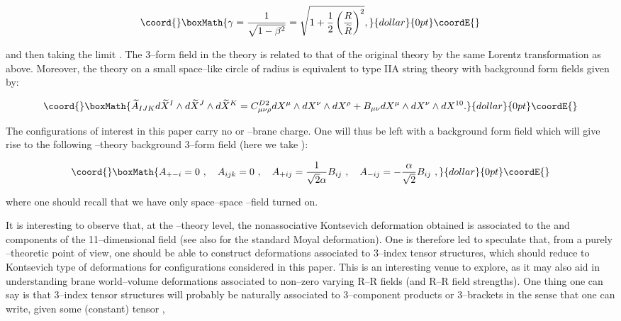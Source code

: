 \documentclass[a4paper,11pt]{article}
\begin{document}
$$\coord{}\boxMath{
\gamma = {1\over \sqrt{1-\beta^{2}}} = \sqrt{1+{1\over 2} \left( {R 
\over \widetilde{R}} \right)^{2}},
}{dollar}{0pt}\coordE{}$$

\noindent
and then taking the limit \coordHE{}. The 3--form field
\coordHE{} in the theory \coordHE{} is related to that of
the original theory \coordHE{} by the same Lorentz transformation as
above. Moreover, the theory \coordHE{} on a small space--like circle
of radius \coordHE{} is equivalent to type IIA string theory with
background form fields given by:

$$\coord{}\boxMath{
\widetilde{A}_{IJK} d\widetilde{X}^{I} \wedge d\widetilde{X}^{J} 
\wedge d\widetilde{X}^{K} = C^{D2}_{\mu\nu\rho} dX^{\mu} \wedge 
dX^{\nu} \wedge dX^{\rho} + B_{\mu\nu} dX^{\mu} \wedge dX^{\nu} \wedge 
dX^{10}.
}{dollar}{0pt}\coordE{}$$

The configurations of interest in this paper carry no \coordHE{} or \coordHE{}--brane
charge. One will thus be left with a \coordHE{} background form field
which will give rise to the following \coordHE{}--theory background 3--form field
(here we take \coordHE{}):

$$\coord{}\boxMath{
A_{+-i} = 0\ , \ \ \ A_{ijk} = 0\ , \ \ \ 
A_{+ij} = {1\over\sqrt{2}\alpha} B_{ij}\ , \ \ \ 
A_{-ij} = -{\alpha\over\sqrt{2}} B_{ij}\ , 
}{dollar}{0pt}\coordE{}$$

\noindent
where one should recall that we have only space--space \coordHE{}--field turned on.

It is interesting to observe that, at the \myHighlight{$M$}\coordHE{}--theory level, the
nonassociative Kontsevich deformation obtained is associated to the
\myHighlight{$A_{+ij}$}\coordHE{} and \myHighlight{$A_{-ij}$}\coordHE{} components of the 11--dimensional field \coordHE{}
(see also \cite{CHL} for the standard Moyal deformation). One is therefore
led to speculate that, from a purely \myHighlight{$M$}\coordHE{}--theoretic point of view, one
should be able to construct deformations associated to 3--index tensor
structures, which should reduce to Kontsevich type of deformations for
configurations considered in this paper. This is an interesting venue to
explore, as it may also aid in understanding brane world--volume
deformations associated to non--zero varying R--R fields (and R--R field
strengths). One thing one can say is that 3--index tensor structures will
probably be naturally associated to 3--component products or 3--brackets in
the sense that one can write, given some (constant) tensor \coordHE{},
\end{document}
